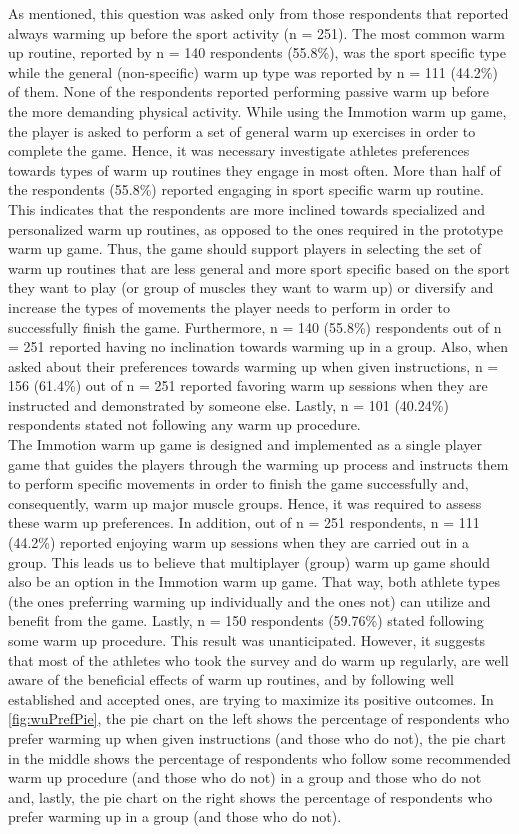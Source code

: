 \begin{itemize}
\end{itemize} As mentioned, this question was asked only from those respondents that reported always warming up before the sport activity (n = 251). The most common warm up routine, reported by n = 140 respondents (55.8\%), was the sport specific type while the general (non-specific) warm up type was reported by n = 111 (44.2\%) of them. None of the respondents reported performing passive warm up before the more demanding physical activity. While using the Immotion warm up game, the player is asked to perform a set of general warm up exercises in order to complete the game. Hence, it was necessary investigate athletes preferences towards types of warm up routines they engage in most often. More than half of the respondents (55.8\%) reported engaging in sport specific warm up routine. This indicates that the respondents are more inclined towards specialized and personalized warm up routines, as opposed to the ones required in the prototype warm up game. Thus, the game should support players in selecting the set of warm up routines that are less general and more sport specific based on the sport they want to play (or group of muscles they want to warm up) or diversify and increase the types of movements the player needs to perform in order to successfully finish the game. Furthermore, n = 140 (55.8\%) respondents out of n = 251 reported having no inclination towards warming up in a group. Also, when asked about their preferences towards warming up when given instructions, n = 156 (61.4\%) out of n = 251 reported favoring warm up sessions when they are instructed and demonstrated by someone else. Lastly, n = 101 (40.24\%) respondents stated not following any warm up procedure.\\The Immotion warm up game is designed and implemented as a single player game that guides the players through the warming up process and instructs them to perform specific movements in order to finish the game successfully and, consequently, warm up major muscle groups. Hence, it was required to assess these warm up preferences. In addition, out of n = 251 respondents, n = 111 (44.2\%) reported enjoying warm up sessions when they are carried out in a group. This leads us to believe that multiplayer (group) warm up game should also be an option in the Immotion warm up game. That way, both athlete types (the ones preferring warming up individually and the ones not) can utilize and benefit from the game.  Lastly, n = 150 respondents (59.76\%) stated following some warm up procedure. This result was unanticipated. However, it suggests that most of the athletes who took the survey and do warm up regularly, are well aware of the beneficial effects of warm up routines, and by following well established and accepted ones, are trying to maximize its positive outcomes. In \ref{fig:wuPrefPie}, the pie chart on the left shows the percentage of respondents who prefer warming up when given instructions (and those who do not), the pie chart in the middle shows the percentage of respondents who follow some recommended warm up procedure (and those who do not) in a group and those who do not and, lastly, the pie chart on the right shows the percentage of respondents who prefer warming up in a group (and those who do not).
